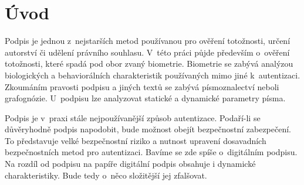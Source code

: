 
%

\chapter{Úvod}
Podpis je jednou z~nejstarších metod používanou pro ověření totožnosti, určení autorství či udělení právního souhlasu.
V~této práci půjde především o~ověření totožnosti, které spadá pod obor zvaný biometrie.
Biometrie se zabývá analýzou biologických a behaviorálních charakteristik používaných mimo jiné k~autentizaci. 
Zkoumáním pravosti podpisu a jiných textů se zabývá písmoznalectví neboli grafognózie.
U~podpisu lze analyzovat statické a dynamické parametry písma. 

Podpis je v~praxi stále nejpoužívanější způsob autentizace. 
Podaří-li se důvěryhodně podpis napodobit, bude možnost obejít bezpečnostní zabezpečení. 
To představuje velké bezpečnostní riziko a nutnost upravení dosavadních bezpečnostních metod pro autentizaci. 
Bavíme se zde spíše o~digitálním podpisu. 
Na rozdíl od podpisu na papíře digitální podpis obsahuje i dynamické charakteristiky.
Bude tedy o~něco složitější jej zfalšovat.




